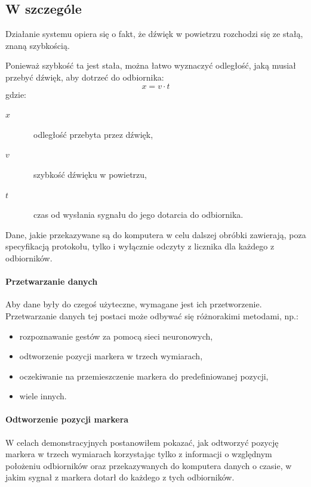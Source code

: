\subsection{W szczególe}
Działanie systemu opiera się o fakt, że dźwięk w powietrzu rozchodzi się ze stałą, znaną szybkością.

Ponieważ szybkość ta jest stała, można łatwo wyznaczyć odległość, jaką musiał przebyć dźwięk, aby dotrzeć do odbiornika:
\begin{equation}
 x = v \cdot t
 \label{eq:sound_distance}
\end{equation}
gdzie:
\begin{description}
 \item[$x$] \ppauza~odległość przebyta przez dźwięk,
 \item[$v$] \ppauza~szybkość dźwięku w powietrzu,
 \item[$t$] \ppauza~czas od wysłania sygnału do jego dotarcia do odbiornika. 
\end{description}

Dane, jakie przekazywane są do komputera w celu dalszej obróbki zawierają, poza specyfikacją protokołu, tylko i wyłącznie odczyty z licznika dla każdego z odbiorników.

\paragraph{Przetwarzanie danych}
Aby dane były do czegoś użyteczne, wymagane jest ich przetworzenie. Przetwarzanie danych tej postaci może odbywać się różnorakimi metodami, np.:
\begin{itemize}
 \item rozpoznawanie gestów za pomocą sieci neuronowych,
 \item odtworzenie pozycji markera w trzech wymiarach,
 \item oczekiwanie na przemieszczenie markera do predefiniowanej pozycji,
 \item wiele innych.
\end{itemize}

\paragraph{Odtworzenie pozycji markera}
W celach demonstracyjnych postanowiłem pokazać, jak odtworzyć pozycję markera w trzech wymiarach korzystając tylko z informacji o względnym położeniu odbiorników oraz przekazywanych do komputera danych o czasie, w jakim sygnał z markera dotarł do każdego z tych odbiorników.
\newline

